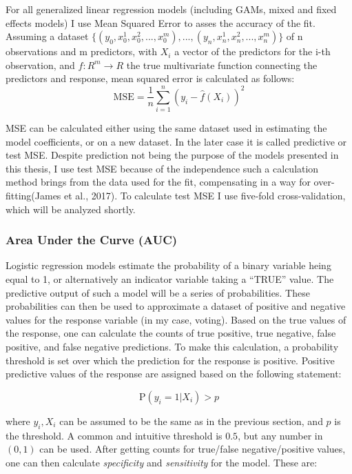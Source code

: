\documentclass[12pt,twoside]{reedthesis}
\begin{document}
  For all generalized linear regression models (including GAMs, mixed and
  fixed effects models) I use Mean Squared Error to asses the accuracy of
  the fit. Assuming a dataset
  \(\{(y_0, x_0^1, x_0^2, ..., x_0^m),...,(y_n, x_n^1, x_n^2, ..., x_n^m)\}\)
  of n observations and m predictors, with \(X_i\) a vector of the
  predictors for the i-th observation, and \(f:R^m \to R\) the true
  multivariate function connecting the predictors and response, mean
  squared error is calculated as follows:
  \[\text{MSE} = \frac{1}{n}\sum_{i=1}^{n}(y_i - \hat{f}(X_i))^2\]
  
  MSE can be calculated either using the same dataset used in estimating
  the model coefficients, or on a new dataset. In the later case it is
  called predictive or test MSE. Despite prediction not being the purpose
  of the models presented in this thesis, I use test MSE because of the
  independence such a calculation method brings from the data used for the
  fit, compensating in a way for over-fitting(James et al., 2017). To
  calculate test MSE I use five-fold cross-validation, which will be
  analyzed shortly.
  
  \subsubsection{Area Under the Curve
  (AUC)}\label{area-under-the-curve-auc}
  
  Logistic regression models estimate the probability of a binary variable
  heing equal to 1, or alternatively an indicator variable taking a
  ``TRUE'' value. The predictive output of such a model will be a series
  of probabilities. These probabilities can then be used to approximate a
  dataset of positive and negative values for the response variable (in my
  case, voting). Based on the true values of the response, one can
  calculate the counts of true positive, true negative, false positive,
  and false negative predictions. To make this calculation, a probability
  threshold is set over which the prediction for the response is positive.
  Positive predictive values of the response are assigned based on the
  following statement:
  
  \[\text{P}(y_i = 1|X_i) > p\]
  
  where \(y_i, X_i\) can be assumed to be the same as in the previous
  section, and \(p\) is the threshold. A common and intuitive threshold is
  \(0.5\), but any number in \((0,1)\) can be used. After getting counts
  for true/false negative/positive values, one can then calculate
  \emph{specificity} and \emph{sensitivity} for the model. These are:
  
\end{document}
